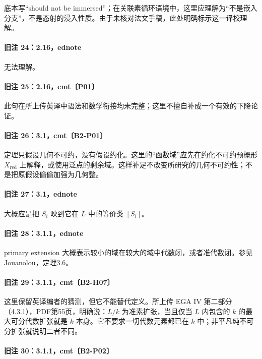 \documentclass[UTF8,a4paper]{ctexbook}
\begin{document}
底本写“should not be immersed”；在关联素循环语境中，这里应理解为“不是嵌入分支”，不是态射的浸入性质。由于未核对法文手稿，此处明确标示这一译校理解。

\paragraph{旧注 24：2.16，ednote}

无法理解。

\paragraph{旧注 25：2.16，cmt〔P01〕}

此句在所上传英译中语法和数学衔接均未完整；这里不擅自补成一个有效的下降论证。

\paragraph{旧注 26：3.1，cmt〔B2-P01〕}

定理只假设几何不可约，没有假设约化。这里的“函数域”应先在约化不可约预概形 $X_{\mathrm{red}}$ 上解释，或使用泛点的剩余域。这样补足不改变所研究的几何不可约性；不是把原假设偷偷加强为几何整。

\paragraph{旧注 27：3.1，ednote}

大概应是把 $S_i$ 映到它在 $L$ 中的等价类 $[S_i]$。

\paragraph{旧注 28：3.1.1，ednote}

primary extension 大概表示较小的域在较大的域中代数闭，或者准代数闭。参见 Jouanolou，定理3.6。

\paragraph{旧注 29：3.1.1，cmt〔B2-H07〕}

这里保留英译编者的猜测，但它不能替代定义。所上传 EGA IV 第二部分（4.3.1），PDF第55页，明确说：$L/k$ 为准素扩张，当且仅当 $L$ 内包含的 $k$ 的最大可分代数扩张就是 $k$ 本身。它不要求一切代数元素都已在 $k$ 中；非平凡纯不可分扩张就说明二者不同。

\paragraph{旧注 30：3.1.1，cmt〔B2-P02〕}
\end{document}
